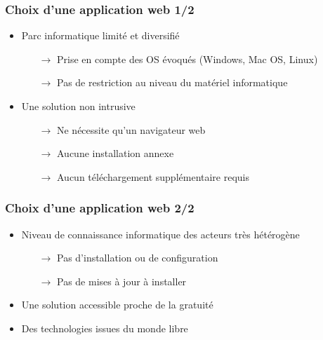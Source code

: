 \begin{frame}
  \frametitle{Choix d'une application web 1/2}
  \begin{itemize}
    \item Parc informatique limité et diversifié
      \begin{itemize}
        \item[$\rightarrow $] Prise en compte des OS évoqués (Windows, Mac OS, Linux)
        \item[$\rightarrow $] Pas de restriction au niveau du matériel informatique
      \end{itemize}
    \item Une solution non intrusive
      \begin{itemize}
        \item[$\rightarrow $] Ne nécessite qu'un navigateur web
        \item[$\rightarrow $] Aucune installation annexe
        \item[$\rightarrow $] Aucun téléchargement supplémentaire requis
      \end{itemize}
\end{itemize}
\end{frame}

\begin{frame}
  \frametitle{Choix d'une application web 2/2}
  \begin{itemize}
    \item Niveau de connaissance informatique des acteurs très hétérogène
      \begin{itemize}
        \item[$\rightarrow $] Pas d'installation ou de configuration
        \item[$\rightarrow $] Pas de mises à jour à installer
      \end{itemize}
    \item Une solution accessible proche de la gratuité
    \item Des technologies issues du monde libre
  \end{itemize}
\end{frame}

